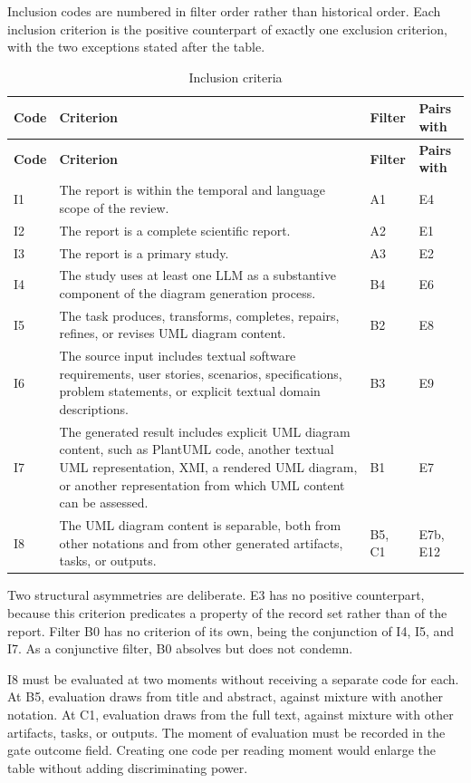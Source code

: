 Inclusion codes are numbered in filter order rather than historical order. Each inclusion criterion is the positive counterpart of exactly one exclusion criterion, with the two exceptions stated after the table.

\begin{longtable}{p{} p{} p{} p{}}
\caption{Inclusion criteria}
\label{tab:protocol_inclusion}\\
\toprule
\textbf{Code} & \textbf{Criterion} & \textbf{Filter} & \textbf{Pairs with} \\
\midrule
\endfirsthead
\toprule
\textbf{Code} & \textbf{Criterion} & \textbf{Filter} & \textbf{Pairs with} \\
\midrule
\endhead
I1 & The report is within the temporal and language scope of the review. & A1 & E4 \\
I2 & The report is a complete scientific report. & A2 & E1 \\
I3 & The report is a primary study. & A3 & E2 \\
I4 & The study uses at least one LLM as a substantive component of the diagram generation process. & B4 & E6 \\
I5 & The task produces, transforms, completes, repairs, refines, or revises UML diagram content. & B2 & E8 \\
I6 & The source input includes textual software requirements, user stories, scenarios, specifications, problem statements, or explicit textual domain descriptions. & B3 & E9 \\
I7 & The generated result includes explicit UML diagram content, such as PlantUML code, another textual UML representation, XMI, a rendered UML diagram, or another representation from which UML content can be assessed. & B1 & E7 \\
I8 & The UML diagram content is separable, both from other notations and from other generated artifacts, tasks, or outputs. & B5, C1 & E7b, E12 \\
\bottomrule
\end{longtable}

Two structural asymmetries are deliberate. E3 has no positive counterpart, because this criterion predicates a property of the record set rather than of the report. Filter B0 has no criterion of its own, being the conjunction of I4, I5, and I7. As a conjunctive filter, B0 absolves but does not condemn.

I8 must be evaluated at two moments without receiving a separate code for each. At B5, evaluation draws from title and abstract, against mixture with another notation. At C1, evaluation draws from the full text, against mixture with other artifacts, tasks, or outputs. The moment of evaluation must be recorded in the gate outcome field. Creating one code per reading moment would enlarge the table without adding discriminating power.

